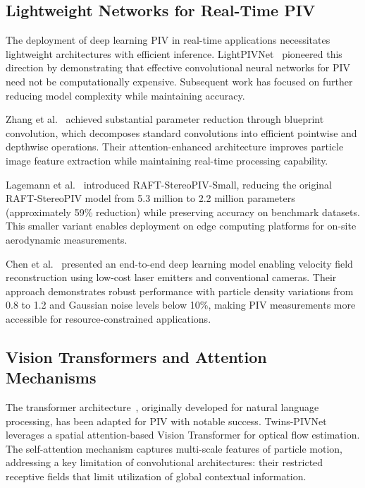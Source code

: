 \subsection{Lightweight Networks for Real-Time PIV}

The deployment of deep learning PIV in real-time applications necessitates lightweight architectures with efficient inference. LightPIVNet~\cite{wang2021lightpivnet} pioneered this direction by demonstrating that effective convolutional neural networks for PIV need not be computationally expensive. Subsequent work has focused on further reducing model complexity while maintaining accuracy.

Zhang et al.~\cite{zhang2024lightweight} achieved substantial parameter reduction through blueprint convolution, which decomposes standard convolutions into efficient pointwise and depthwise operations. Their attention-enhanced architecture improves particle image feature extraction while maintaining real-time processing capability.

Lagemann et al.~\cite{lagemann2024raft_stereopiv} introduced RAFT-StereoPIV-Small, reducing the original RAFT-StereoPIV model from 5.3 million to 2.2 million parameters (approximately 59\% reduction) while preserving accuracy on benchmark datasets. This smaller variant enables deployment on edge computing platforms for on-site aerodynamic measurements.

Chen et al.~\cite{chen2025lowcost_piv} presented an end-to-end deep learning model enabling velocity field reconstruction using low-cost laser emitters and conventional cameras. Their approach demonstrates robust performance with particle density variations from 0.8 to 1.2 and Gaussian noise levels below 10\%, making PIV measurements more accessible for resource-constrained applications.

\subsection{Vision Transformers and Attention Mechanisms}

The transformer architecture~\cite{vaswani2017attention}, originally developed for natural language processing, has been adapted for PIV with notable success. Twins-PIVNet~\cite{reddy2025twins_pivnet} leverages a spatial attention-based Vision Transformer for optical flow estimation. The self-attention mechanism captures multi-scale features of particle motion, addressing a key limitation of convolutional architectures: their restricted receptive fields that limit utilization of global contextual information.

